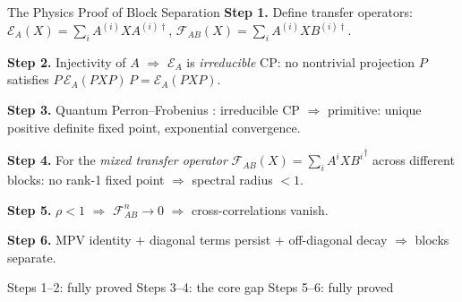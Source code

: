 \documentclass[aspectratio=169,10pt]{beamer}
\begin{document}
\begin{frame}{The Physics Proof of Block Separation \cite{Cirac2017Annals} \cite{Cirac2021Matrix}}
    \vspace{-0.3em}
    \textbf{Step 1.}  Define transfer operators:
    $ \mathcal{E}_A(X) = \sum_i A^{(i)} X A^{(i)\dagger}$,\quad
    $\mathcal{F}_{AB}(X) = \sum_i A^{(i)} X B^{(i)\dagger}$.

    \vspace{0.2em}
    \textbf{Step 2.}  Injectivity of $A$ $\Rightarrow$ $\mathcal{E}_A$ is \emph{irreducible} CP:
    no nontrivial projection $P$ satisfies $P\,\mathcal{E}_A(PXP)\,P = \mathcal{E}_A(PXP)$.

    \vspace{0.2em}
    \textbf{Step 3.}  \textcolor{amber}{Quantum Perron--Frobenius} \cite{Evans1978Spectral}:
    irreducible CP $\Rightarrow$ primitive: unique positive definite fixed point, exponential convergence.

    \vspace{0.2em}
    \textbf{Step 4.}  For the \emph{mixed transfer operator} $\mathcal{F}_{AB}(X)=\sum_i A^i X {B^i}^\dagger$ across different blocks:
    no rank-1 fixed point $\Rightarrow$ spectral radius $< 1$.

    \vspace{0.2em}
    \textbf{Step 5.}  $\rho < 1$ $\Rightarrow$ $\mathcal{F}_{AB}^n \to 0$ $\Rightarrow$ cross-correlations vanish.

    \vspace{0.2em}
    \textbf{Step 6.}  MPV identity $+$ diagonal terms persist $+$ off-diagonal decay
    $\Rightarrow$ blocks separate.

    \vspace{0.4em}
    \begin{center}
        {\small Steps 1--2: fully proved \textcolor{leangreen}{\checkmark}\quad
            Steps 3--4: \textcolor{softred}{the core gap}\quad
            Steps 5--6: fully proved \textcolor{leangreen}{\checkmark}}
    \end{center}
\end{frame}
\end{document}
